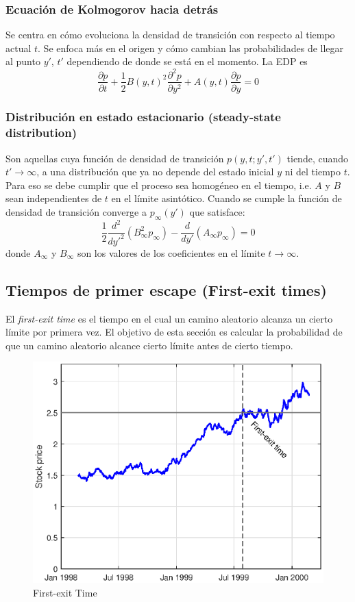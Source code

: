 \subsubsection{Ecuación de Kolmogorov hacia detrás}
Se centra en cómo evoluciona la densidad de transición con respecto al tiempo actual $t$. Se enfoca más en el origen  y cómo cambian las probabilidades de llegar al punto $y'$, $t'$ dependiendo de donde se está en el momento. La EDP es
\[
    \boxed{\frac{\partial p}{\partial t} + \frac{1}{2} B(y, t)^2 \frac{\partial^2 p}{\partial y^2} + A(y, t) \frac{\partial p}{\partial y} = 0}
\]


\subsubsection{Distribución en estado estacionario (steady-state distribution)}
Son aquellas cuya función de densidad de transición $p(y, t; y', t')$ tiende, cuando $t' \to \infty$, a una distribución que ya no depende del estado inicial $y$ ni del tiempo $t$. Para eso se debe cumplir que el proceso sea homogéneo en el tiempo, i.e. $A$ y $B$ sean independientes de $t$ en el límite asintótico. Cuando se cumple la función de densidad de transición converge a $p_\infty(y')$ que satisface:
\[
    \boxed{\frac{1}{2} \frac{d^2}{dy'^2} \left( B_\infty^2 p_\infty \right) - \frac{d}{dy'} \left( A_\infty p_\infty \right) = 0}
\]
donde $A_\infty$ y $B_\infty$ son los valores de los coeficientes en el límite $t \to \infty$.








\subsection{Tiempos de primer escape (First-exit times)}
El \textit{first-exit time} es el tiempo en el cual un camino aleatorio alcanza un cierto límite por primera vez. El objetivo de esta sección es calcular la probabilidad de que un camino aleatorio alcance cierto límite antes de cierto tiempo.
\begin{figure}[H]
    \centering
    \includegraphics[width=0.65\linewidth]{Imagenes/3_Aleatoriedad/First-exit_Time.eps}
    \caption{First-exit Time}
\end{figure}





